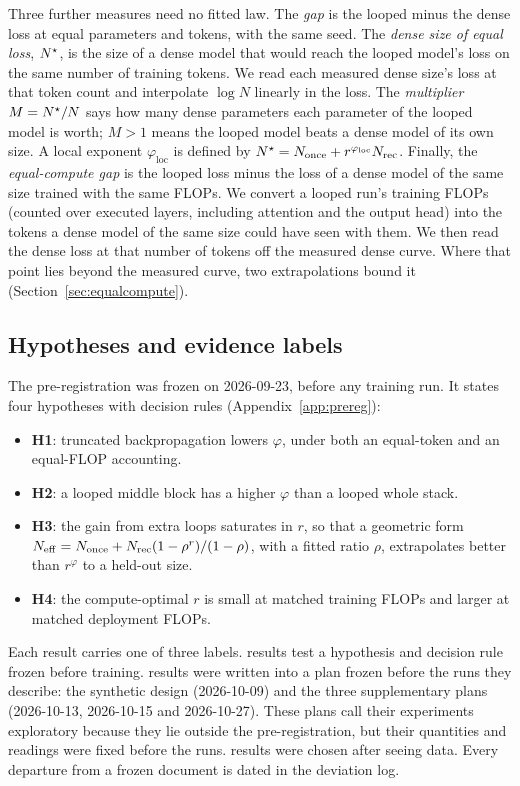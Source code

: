 Three further measures need no fitted law. The \emph{gap} is the looped minus the dense loss at equal parameters and
tokens, with the same seed. The \emph{dense size of equal loss}, $N^{\star}$, is the size of a dense model that would reach the looped model's
  loss on the same number of training tokens. We read each measured dense size's loss at that token count and
  interpolate $\log N$ linearly in the loss. The \emph{multiplier} $M = N^{\star}/N$ says how many dense parameters each
  parameter of the looped model is worth; $M > 1$ means the looped model beats a dense model of its own size. A local
  exponent $\varphi_{\mathrm{loc}}$ is defined by $N^{\star} = N_{\mathrm{once}} + r^{\varphi_{\mathrm{loc}}}N_{\mathrm{rec}}$. Finally, the
\emph{equal-compute gap} is the looped loss minus the loss of a dense model of the same size trained with the
  same FLOPs. We convert a looped run's training FLOPs (counted over executed layers, including attention and the output
  head) into the tokens a dense model of the same size could have seen with them. We then read the
  dense loss at that number of tokens off the measured dense curve. Where that point lies beyond the measured curve, two extrapolations bound it (Section~\ref{sec:equalcompute}).

\subsection{Hypotheses and evidence labels}
\label{sec:hypotheses}

The pre-registration was frozen on 2026-09-23, before any training run. It states four hypotheses with decision rules
(Appendix~\ref{app:prereg}):
\begin{itemize}
  \item \textbf{H1}: truncated backpropagation lowers $\varphi$, under both an equal-token and an equal-FLOP accounting.
  \item \textbf{H2}: a looped middle block has a higher $\varphi$ than a looped whole stack.
  \item \textbf{H3}: the gain from extra loops saturates in $r$, so that a geometric form
  $N_{\mathrm{eff}} = N_{\mathrm{once}} + N_{\mathrm{rec}}(1-\rho^r)/(1-\rho)$, with a fitted ratio $\rho$, extrapolates better than $r^{\varphi}$ to a
  held-out size.
  \item \textbf{H4}: the compute-optimal $r$ is small at matched training FLOPs and larger at matched deployment FLOPs.
\end{itemize}
Each result carries one of three labels.  results test a hypothesis and decision rule frozen
before training.  results were written into a plan frozen before the runs they describe: the
synthetic design (2026-10-09) and the three supplementary plans (2026-10-13, 2026-10-15 and 2026-10-27). These plans
call their experiments exploratory because they lie outside the pre-registration, but their quantities and readings were
fixed before the runs.  results were chosen after seeing data.
Every departure from a frozen document is dated in the deviation log.
